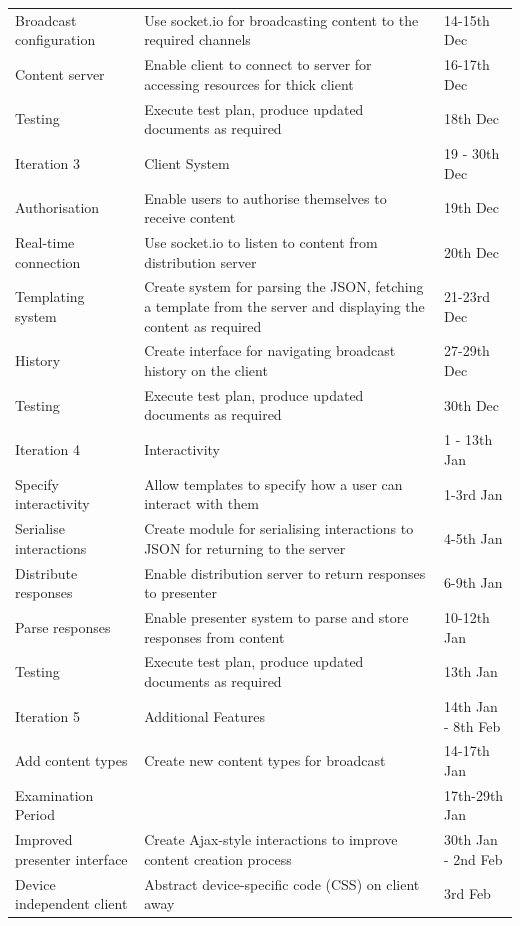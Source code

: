 \documentclass[a4papert,11pt,notitlepage]{ltxdoc}
\begin{document}
\begin{longtable}{l p{7cm} l}
Broadcast configuration & Use socket.io for broadcasting content to the required channels & 14-15th Dec \\
Content server & Enable client to connect to server for accessing resources for thick client & 16-17th Dec \\
Testing & Execute test plan, produce updated documents as required & 18th Dec \\[1cm]
\hline
Iteration 3 & Client System & 19 - 30th Dec \\
\hline
Authorisation & Enable users to authorise themselves to receive content & 19th Dec \\
Real-time connection & Use socket.io to listen to content from distribution server & 20th Dec \\
Templating system & Create system for parsing the JSON, fetching a template from the server and displaying the content as required & 21-23rd Dec \\
History & Create interface for navigating broadcast history on the client & 27-29th Dec \\
Testing & Execute test plan, produce updated documents as required & 30th Dec \\[1cm]
\hline
Iteration 4 & Interactivity & 1 - 13th Jan \\
\hline
Specify interactivity & Allow templates to specify how a user can interact with them & 1-3rd Jan \\
Serialise interactions & Create module for serialising interactions to JSON for returning to the server & 4-5th Jan \\
Distribute responses & Enable distribution server to return responses to presenter & 6-9th Jan \\
Parse responses & Enable presenter system to parse and store responses from content & 10-12th Jan \\
Testing & Execute test plan, produce updated documents as required & 13th Jan \\[1cm]
\hline
Iteration 5 & Additional Features & 14th Jan - 8th Feb \\
\hline
Add content types & Create new content types for broadcast & 14-17th Jan \\
Examination Period & & 17th-29th Jan \\
Improved presenter interface & Create Ajax-style interactions to improve content creation process & 30th Jan - 2nd Feb \\
Device independent client & Abstract device-specific code (CSS) on client away & 3rd Feb \\

\end{longtable}
\end{document}
